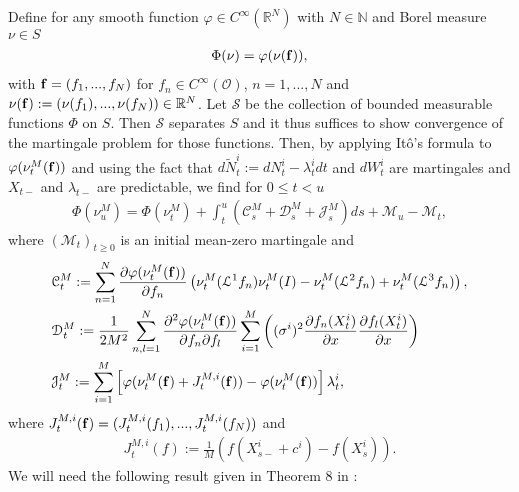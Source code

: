 \documentclass[10pt]{article}
\theoremstyle{plain}
\theoremstyle{definition}
\newcommand{\<}{\langle}
\renewcommand{\>}{\rangle}
\renewcommand{\(}{\left(}
\renewcommand{\)}{\right)}
\renewcommand{\[}{\left[}
\renewcommand{\]}{\right]}
\def \phi {{\varphi}}
\begin{document}
Define for any smooth function $\phi\in C^\infty(\mathbb{R}^N)$ with $N\in\mathbb{N}$ and Borel measure $\nu\in S$
\begin{align}\label{eq:phi}
\Phi(\nu) = \phi(\nu(\bold{f})),
\end{align}
with $\bold{f}=(f_1,...,f_N)$ for $f_n\in C^\infty(\mathcal{O})$, $n=1,...,N$ and
$\nu(\bold{f}):=(\nu(f_1),...,\nu(f_N))\in\mathbb{R}^N$. Let $\mathcal{S}$ be the collection
of bounded measurable functions $\Phi$ on $S$. Then $\mathcal{S}$ separates $S$ and it thus
suffices to show convergence of the martingale problem for those functions. Then, by
applying It\^o's formula to $\phi(\nu_t^M(\bold{f}))$ and using the fact that $d\tilde
N_t^i:=dN_t^i-\lambda_t^idt$ and $dW^i_t$ are martingales and $X_{t-}$ and $\lambda_{t-}$ are
predictable, we find for $0\leq t<u$
\begin{align}
\Phi(\nu_u^M)=\Phi(\nu_t^M)+\int_t^u\left(\mathcal{C}_s^M+\mathcal{D}_s^M+\mathcal{J}_s^M\right)ds+\mathcal{M}_u-\mathcal{M}_t,
\end{align}
where $(\mathcal{M}_t)_{t\geq 0}$ is an initial mean-zero martingale and
\begin{align}
&\mathcal{C}_t^M:=\sum\limits_{n=1}^N\frac{\partial\phi(\nu_t^M(\bold{f}))}{\partial
f_n}\left(\nu_t^M(\mathcal{L}^1f_n)\nu_t^M(I)-\nu_t^M(\mathcal{L}^2f_n)+\nu_t^M(\mathcal{L}^3f_n)\right),\\
&\mathcal{D}_t^M:=\frac{1}{2M^2}\sum\limits_{n,l=1}^N\frac{\partial^2\phi(\nu_t^M(\bold{f}))}{\partial
f_n\partial f_l}\sum\limits_{i=1}^M\left((\sigma^i)^2\frac{\partial
f_n(X_t^i)}{\partial x}\frac{\partial f_l(X_t^i)}{\partial x}\right)\\
&\mathcal{J}_t^M:=\sum\limits_{i=1}^M\left[\phi(\nu_t^M(\bold{f})+J_t^{M,i}(\bold{f}))-\phi(\nu_t^M(\bold{f}))\right]\lambda_t^i,
\end{align}
where $J_t^{M,i}(\bold{f})=(J_t^{M,i}(f_1),...,J_t^{M,i}(f_N))$ and
\begin{align}
J_t^{M,i}(f):=\frac{1}{M}(f(X_{s-}^i+c^i)-f(X_s^i)).
\end{align}
We will need the following result given in Theorem 8 in \citet{delattre16}:
\end{document}
